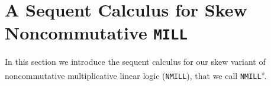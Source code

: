 \documentclass[submission,copyright,creativecommons]{eptcs}
\theoremstyle{definition}
\newcommand{\MILL}{\texttt{MILL}}
\newcommand{\NMILL}{\texttt{NMILL}}
\newcommand{\SkNMILL}{\NMILL\textsuperscript{\textit{s}}}
\begin{document}

\section{A Sequent Calculus for Skew Noncommutative \MILL}\label{sec2}
In this section we introduce the sequent calculus for our skew variant of noncommutative multiplicative linear logic (\NMILL), that we call \SkNMILL. 
\end{document}
